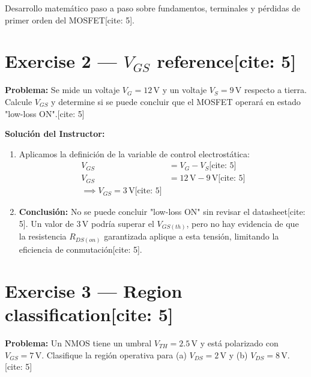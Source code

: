 \documentclass[11pt, a4paper]{article}
\begin{document}
\begin{tcolorbox}[colback=ucbblue!5, colframe=ucbblue, title=\textbf{Hoja de Ejercicios y Solucionario Docente (W11S01)[cite: 5]}]
    Desarrollo matemático paso a paso sobre fundamentos, terminales y pérdidas de primer orden del MOSFET[cite: 5].
\end{tcolorbox}

\section*{Exercise 2 — $V_{GS}$ reference[cite: 5]}
\textbf{Problema:} Se mide un voltaje $V_G = 12\,\text{V}$ y un voltaje $V_S = 9\,\text{V}$ respecto a tierra. Calcule $V_{GS}$ y determine si se puede concluir que el MOSFET operará en estado "low-loss ON".[cite: 5]

\vspace{0.2cm}
\textbf{Solución del Instructor:}
\begin{enumerate}
    \item Aplicamos la definición de la variable de control electrostática:
    \begin{align*}
        V_{GS} &= V_G - V_S \text{[cite: 5]} \\
        V_{GS} &= 12\,\text{V} - 9\,\text{V} \text{[cite: 5]} \\
        \implies \boxed{V_{GS} = 3\,\text{V}} \text{[cite: 5]}
    \end{align*}
    \item \textbf{Conclusión:} No se puede concluir "low-loss ON" sin revisar el datasheet[cite: 5]. Un valor de $3\,\text{V}$ podría superar el $V_{GS(th)}$, pero no hay evidencia de que la resistencia $R_{DS(on)}$ garantizada aplique a esta tensión, limitando la eficiencia de conmutación[cite: 5].
\end{enumerate}

\section*{Exercise 3 — Region classification[cite: 5]}
\textbf{Problema:} Un NMOS tiene un umbral $V_{TH} = 2.5\,\text{V}$ y está polarizado con $V_{GS} = 7\,\text{V}$. Clasifique la región operativa para (a) $V_{DS} = 2\,\text{V}$ y (b) $V_{DS} = 8\,\text{V}$.[cite: 5]
\end{document}
